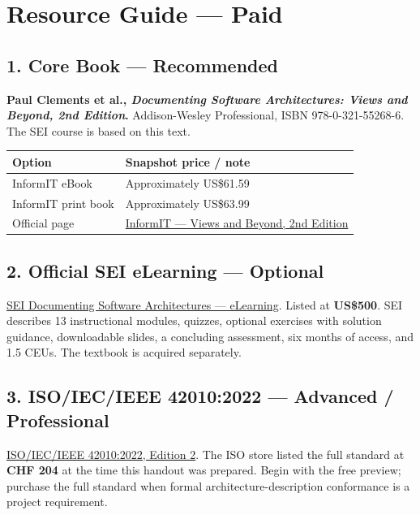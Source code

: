 \documentclass[10pt,letterpaper]{article}
\begin{document}
\section{Resource Guide --- Paid}

\subsection{1. Core Book --- Recommended}
\textbf{Paul Clements et al., \emph{Documenting Software Architectures: Views and Beyond, 2nd Edition}.} Addison-Wesley Professional, ISBN 978-0-321-55268-6. The SEI course is based on this text.

\begin{tabularx}{\textwidth}{@{}P{0.27\textwidth}Y@{}}
\toprule
{}\textbf{Option} & \textbf{Snapshot price / note} \\
\midrule
InformIT eBook & Approximately US\$61.59 \\
InformIT print book & Approximately US\$63.99 \\
Official page & \href{https://www.informit.com/store/documenting-software-architectures-views-and-beyond-9780321552686}{InformIT --- Views and Beyond, 2nd Edition} \\
\bottomrule
\end{tabularx}

\subsection{2. Official SEI eLearning --- Optional}
\href{https://www.sei.cmu.edu/training/documenting-software-architectures-elearning/}{SEI Documenting Software Architectures --- eLearning}. Listed at \textbf{US\$500}. SEI describes 13 instructional modules, quizzes, optional exercises with solution guidance, downloadable slides, a concluding assessment, six months of access, and 1.5 CEUs. The textbook is acquired separately.

\subsection{3. ISO/IEC/IEEE 42010:2022 --- Advanced / Professional}
\href{https://www.iso.org/standard/74393.html}{ISO/IEC/IEEE 42010:2022, Edition 2}. The ISO store listed the full standard at \textbf{CHF 204} at the time this handout was prepared. Begin with the free preview; purchase the full standard when formal architecture-description conformance is a project requirement.
\end{document}
